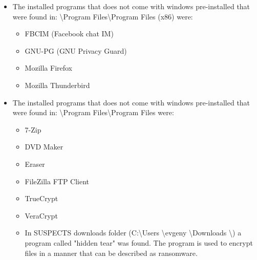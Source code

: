 \begin{enumerate}
\begin{itemize}
		\item The installed programs that does not come with windows pre-installed that were found in:
		\textbackslash Program Files\textbackslash Program Files (x86) were:
		
		\begin{itemize}
			\item FBCIM (Facebook chat IM) 
			\item GNU-PG (GNU Privacy Guard) 
			\item Mozilla Firefox
			\item Mozilla Thunderbird
		\end{itemize}
		
		\item The installed programs that does not come with windows pre-installed that were found in:
		\textbackslash Program Files\textbackslash Program Files were:

		\begin{itemize}
			\item 7-Zip
			\item DVD Maker
			\item Eraser
			\item FileZilla FTP Client
			\item TrueCrypt
			\item VeraCrypt
			
			\item In SUSPECTS downloads folder (C:\textbackslash Users \textbackslash evgeny \textbackslash Downloads \textbackslash) a program called "hidden tear" was found. The program is used to encrypt files in a manner that can be described as ransomware.
			
		\end{itemize}



\end{itemize}
\end{enumerate}
